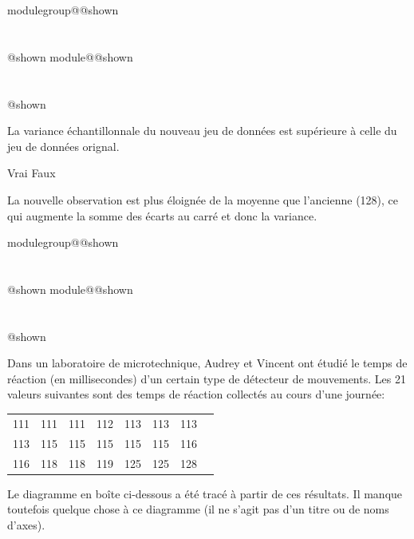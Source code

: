\documentclass{Evaluation}
\makeatletter
\newcommand{\currentmodulekey}{}
\newcommand{\currentmoduletitle}{}
\newcommand{\currentgroupkey}{}
\newcommand{\currentgrouptitle}{}
\newcommand{\showmoduleifneeded}{%
  \ifx\currentgroupkey\empty\else
    \expandafter\ifx\csname modulegroup@\currentgroupkey @shown\endcsname\relax
      \section*{\currentgrouptitle}%
      \expandafter\gdef\csname modulegroup@\currentgroupkey @shown\endcsname{1}%
    \fi
  \fi
  \expandafter\ifx\csname module@\currentmodulekey @shown\endcsname\relax
    \section*{\currentmoduletitle}%
    \expandafter\gdef\csname module@\currentmodulekey @shown\endcsname{1}%
  \fi
}
\newenvironment{H23}{\showmoduleifneeded}{}
\newenvironment{A23}{\showmoduleifneeded}{}
\makeatother
\begin{document}
\begin{questions}
\begin{H23}
\begin{parts}
\begin{subparts}
\subpart[3] La variance échantillonnale du nouveau jeu de données est supérieure à celle du jeu de données orignal.

    \begin{oneparcheckboxes}
        \correctchoice Vrai
        \choice Faux
    \end{oneparcheckboxes}
\begin{solution}
La nouvelle observation est plus éloignée de la moyenne que l'ancienne (128), ce qui augmente la somme des écarts au carré et donc la variance.
\end{solution}

\end{subparts}
\end{parts}
\end{H23}

\begin{A23}
\question {} %
\label{A23-I11-micro}
Dans un laboratoire de microtechnique, Audrey et Vincent ont étudié le temps de réaction (en millisecondes) d'un certain type de détecteur de mouvements. Les 21 valeurs suivantes sont des temps de réaction collectés au cours d'une journée:

\begin{center}
\begin{tabular}{  c c c c c c c c }
111  &111  &111  &112  &113  &113  &113 \\
113 &115  &115  &115  &115 &115 & 116 \\
116 & 118 & 118 & 119 & 125 &125 & 128\\
\end{tabular}
\end{center}

Le diagramme en boîte ci-dessous a été tracé à partir de ces résultats. Il manque toutefois quelque chose à ce diagramme (il ne s'agit pas d'un titre ou de noms d'axes).

\medskip

\end{A23}
\end{questions}
\end{document}
